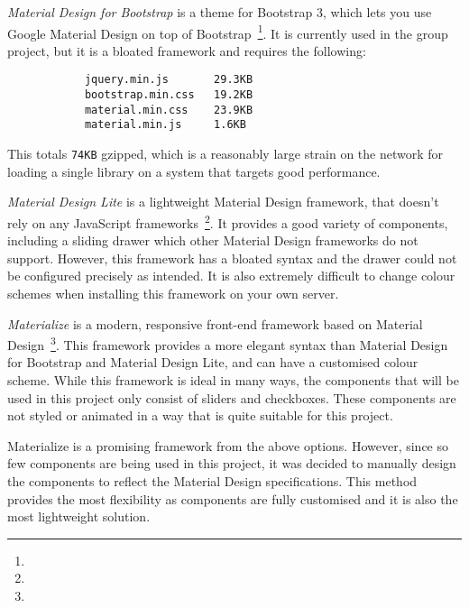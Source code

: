 {{		\emph{Material Design for Bootstrap} is a theme for Bootstrap 3, which lets you use Google Material Design on top of Bootstrap~\footnote{}. It is currently used in the group project, but it is a bloated framework and requires the following:

		\begin{verbatim}
			jquery.min.js 		29.3KB
			bootstrap.min.css 	19.2KB 
			material.min.css 	23.9KB
			material.min.js 	1.6KB
		\end{verbatim}

		This totals \texttt{74KB} gzipped, which is a reasonably large strain on the network for loading a single library on a system that targets good performance.
		
		\emph{Material Design Lite} is a lightweight Material Design framework, that doesn't rely on any JavaScript frameworks~\footnote{}. It provides a good variety of components, including a sliding drawer which other Material Design frameworks do not support. However, this framework has a bloated syntax and the drawer could not be configured precisely as intended. It is also extremely difficult to change colour schemes when installing this framework on your own server.

		\emph{Materialize} is a modern, responsive front-end framework based on Material Design~\footnote{}. This framework provides a more elegant syntax than Material Design for Bootstrap and Material Design Lite, and can have a customised colour scheme. While this framework is ideal in many ways, the components that will be used in this project only consist of sliders and checkboxes. These components are not styled or animated in a way that is quite suitable for this project.

		Materialize is a promising framework from the above options. However, since so few components are being used in this project, it was decided to manually design the components to reflect the Material Design specifications. This method provides the most flexibility as components are fully customised and it is also the most lightweight solution.

	}

}

